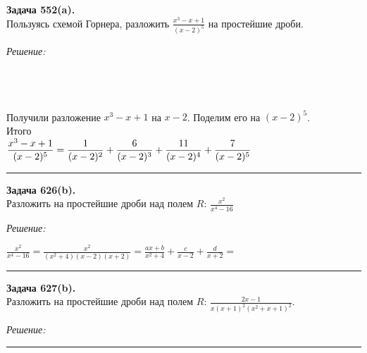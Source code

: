 \documentclass[a4paper, 12pt]{article}
\newenvironment{problem}[2][Задача]
    { \begin{mdframed}[backgroundcolor=gray!10] \textbf{#1 #2.} \\}
    {  \end{mdframed}}
\newenvironment{solution}
    {\textit{Решение: }}
    {\noindent\rule{7in}{1.5pt}}
\begin{document}
\begin{problem}{552(a)}
Пользуясь схемой Горнера, разложить $\displaystyle\frac{x^3-x+1}{(x-2)^5}$ на простейшие дроби.
\end{problem}
\begin{solution}

 \\
 \\
 \\

Получили разложение $x^3-x+1$ на $x-2$. Поделим его на $(x-2)^5$. \\
Итого \\
$
\displaystyle\frac{x^3-x+1}{(x-2)^5} = 
\frac{1}{(x-2)^2} + \frac{6}{(x-2)^3} + \frac{11}{(x-2)^4} + \frac{7}{(x-2)^5} \\
$

\end{solution} 

\begin{problem}{626(b)}
Разложить на простейшие дроби над полем $R$:
$\frac{x^2}{x^4-16}$
\end{problem}
\begin{solution}

$
\frac{x^2}{x^4-16} = \frac{x^2}{(x^2+4)(x - 2)(x + 2)} = 
\frac{ax + b}{x^2+4} + \frac{c}{x - 2} + \frac{d}{x + 2} = 
$

\end{solution} 

\begin{problem}{627(b)}
Разложить на простейшие дроби над полем $R$:
$\frac{2x-1}{x(x+1)^2(x^2+x+1)^2}$.
\end{problem}
\begin{solution}



\end{solution} 
\end{document}
